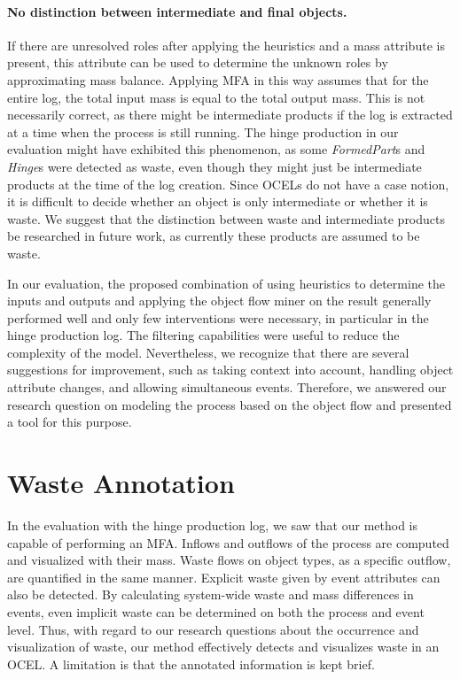\paragraph{No distinction between intermediate and final objects.}
If there are unresolved roles after applying the heuristics and a mass attribute is present, this attribute can be used to determine the unknown roles by approximating mass balance.
Applying MFA in this way assumes that for the entire log, the total input mass is equal to the total output mass.
This is not necessarily correct, as there might be intermediate products if the log is extracted at a time when the process is still running.
The hinge production in our evaluation might have exhibited this phenomenon, as some \emph{FormedPart}s and \emph{Hinge}s were detected as waste, even though they might just be intermediate products at the time of the log creation.
Since OCELs do not have a case notion, it is difficult to decide whether an object is only intermediate or whether it is waste.
We suggest that the distinction between waste and intermediate products be researched in future work, as currently these products are assumed to be waste.



In our evaluation, the proposed combination of using heuristics to determine the inputs and outputs and applying the object flow miner on the result generally performed well and only few interventions were necessary, in particular in the hinge production log.
The filtering capabilities were useful to reduce the complexity of the model.
Nevertheless, we recognize that there are several suggestions for improvement, such as taking context into account, handling object attribute changes, and allowing simultaneous events.
Therefore, we answered our research question on modeling the process based on the object flow and presented a tool for this purpose.






\section{Waste Annotation}



In the evaluation with the hinge production log, we saw that our method is capable of performing an MFA.
Inflows and outflows of the process are computed and visualized with their mass.
Waste flows on object types, as a specific outflow, are quantified in the same manner.
Explicit waste given by event attributes can also be detected.
By calculating system-wide waste and mass differences in events, even implicit waste can be determined on both the process and event level.
Thus, with regard to our research questions about the occurrence and visualization of waste,  our method effectively detects and visualizes waste in an OCEL.
A limitation is that the annotated information is kept brief.



